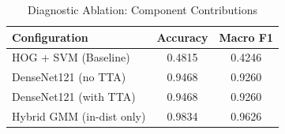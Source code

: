 \begin{table}[h]
\centering
\caption{Diagnostic Ablation: Component Contributions}
\label{tab:diagnostic_ablation}
\begin{tabular}{lcc}
\toprule
Configuration & Accuracy & Macro F1 \\
\midrule
HOG + SVM (Baseline) & 0.4815 & 0.4246 \\
DenseNet121 (no TTA) & 0.9468 & 0.9260 \\
DenseNet121 (with TTA) & 0.9468 & 0.9260 \\
Hybrid GMM (in-dist only) & 0.9834 & 0.9626 \\
\bottomrule
\end{tabular}
\end{table}